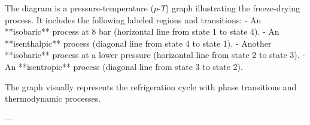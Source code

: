 The diagram is a pressure-temperature (\(p\)-\(T\)) graph illustrating the freeze-drying process. It includes the following labeled regions and transitions:  
- An **isobaric** process at 8 bar (horizontal line from state 1 to state 4).  
- An **isenthalpic** process (diagonal line from state 4 to state 1).  
- Another **isobaric** process at a lower pressure (horizontal line from state 2 to state 3).  
- An **isentropic** process (diagonal line from state 3 to state 2).  

The graph visually represents the refrigeration cycle with phase transitions and thermodynamic processes.

---